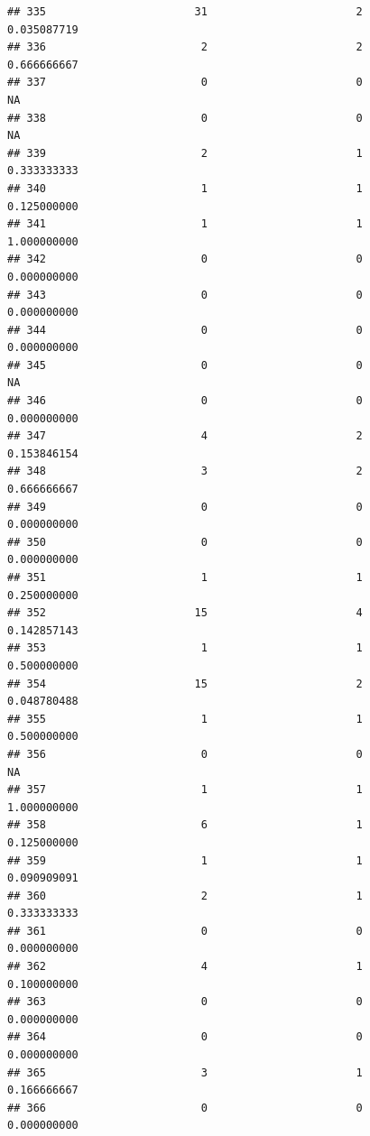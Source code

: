 \documentclass[
]{article}
\begin{document}
\begin{verbatim}
## 335                       31                       2               0.035087719
## 336                        2                       2               0.666666667
## 337                        0                       0                        NA
## 338                        0                       0                        NA
## 339                        2                       1               0.333333333
## 340                        1                       1               0.125000000
## 341                        1                       1               1.000000000
## 342                        0                       0               0.000000000
## 343                        0                       0               0.000000000
## 344                        0                       0               0.000000000
## 345                        0                       0                        NA
## 346                        0                       0               0.000000000
## 347                        4                       2               0.153846154
## 348                        3                       2               0.666666667
## 349                        0                       0               0.000000000
## 350                        0                       0               0.000000000
## 351                        1                       1               0.250000000
## 352                       15                       4               0.142857143
## 353                        1                       1               0.500000000
## 354                       15                       2               0.048780488
## 355                        1                       1               0.500000000
## 356                        0                       0                        NA
## 357                        1                       1               1.000000000
## 358                        6                       1               0.125000000
## 359                        1                       1               0.090909091
## 360                        2                       1               0.333333333
## 361                        0                       0               0.000000000
## 362                        4                       1               0.100000000
## 363                        0                       0               0.000000000
## 364                        0                       0               0.000000000
## 365                        3                       1               0.166666667
## 366                        0                       0               0.000000000

\end{verbatim}
\end{document}
